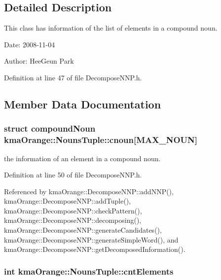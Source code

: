 \subsection{Detailed Description}
This class has information of the list of elements in a compound noun. 

\begin{Desc}
\item[Date:]2008-11-04 \end{Desc}
\begin{Desc}
\item[Author:]HeeGeun Park \end{Desc}


Definition at line 47 of file DecomposeNNP.h.

\subsection{Member Data Documentation}
\hypertarget{classkmaOrange_1_1NounsTuple_dbf8742a114ba2bd71b2160b484e36d1}{
\subsubsection[{cnoun}]{\setlength{\rightskip}{0pt plus 5cm}struct {\bf compoundNoun} {\bf kmaOrange::NounsTuple::cnoun}\mbox{[}MAX\_\-NOUN\mbox{]}}}
\label{classkmaOrange_1_1NounsTuple_dbf8742a114ba2bd71b2160b484e36d1}


the information of an element in a compound noun. 



Definition at line 50 of file DecomposeNNP.h.

Referenced by kmaOrange::DecomposeNNP::addNNP(), kmaOrange::DecomposeNNP::addTuple(), kmaOrange::DecomposeNNP::checkPattern(), kmaOrange::DecomposeNNP::decomposing(), kmaOrange::DecomposeNNP::generateCandidates(), kmaOrange::DecomposeNNP::generateSimpleWord(), and kmaOrange::DecomposeNNP::getDecomposedInformation().\hypertarget{classkmaOrange_1_1NounsTuple_0e542c73cf0f11dd256a9b9079c6682e}{
\subsubsection[{cntElements}]{\setlength{\rightskip}{0pt plus 5cm}int {\bf kmaOrange::NounsTuple::cntElements}}}
\label{classkmaOrange_1_1NounsTuple_0e542c73cf0f11dd256a9b9079c6682e}


